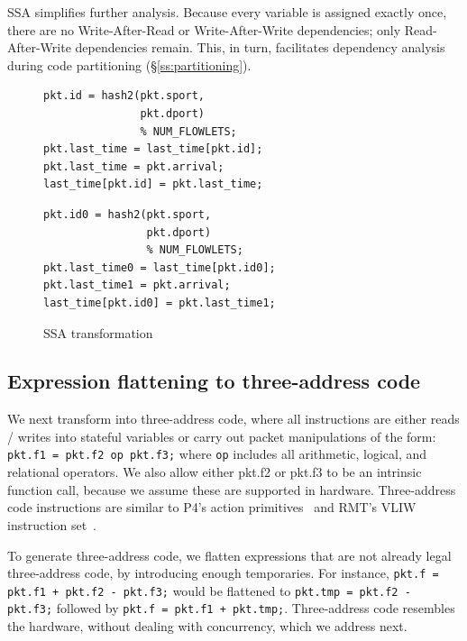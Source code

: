 SSA simplifies further analysis. Because every variable is assigned exactly
once, there are no Write-After-Read or Write-After-Write dependencies; only
Read-After-Write dependencies remain. This, in turn, facilitates dependency
analysis during code partitioning (\S\ref{ss:partitioning}).

\begin{figure}[!t]
  \begin{minipage}{0.48\textwidth}
  \begin{small}
  \begin{lstlisting}[style=customc]
pkt.id = hash2(pkt.sport,
               pkt.dport)
               % NUM_FLOWLETS;
pkt.last_time = last_time[pkt.id];
pkt.last_time = pkt.arrival;
last_time[pkt.id] = pkt.last_time;
  \end{lstlisting}
  \end{small}
  \end{minipage}
  \begin{minipage}{0.52\textwidth}
  \begin{small}
  \begin{lstlisting}[style=customc]
pkt.id0 = hash2(pkt.sport,
                pkt.dport)
                % NUM_FLOWLETS;
pkt.last_time0 = last_time[pkt.id0];
pkt.last_time1 = pkt.arrival;
last_time[pkt.id0] = pkt.last_time1;
  \end{lstlisting}
  \end{small}
  \end{minipage}
  \caption{SSA transformation}
\label{fig:ssa}
\end{figure}

\subsection{Expression flattening to three-address code}
We next transform into three-address code, where all instructions are either
reads / writes into stateful variables or carry out packet manipulations of the
form: \texttt{pkt.f1 = pkt.f2 op pkt.f3;} where \texttt{op} includes all
arithmetic, logical, and relational operators. We also allow either pkt.f2 or
pkt.f3 to be an intrinsic function call, because we assume these are supported
in hardware. Three-address code instructions are similar to P4's action
primitives~\cite{p4spec} and RMT's VLIW instruction set~\cite{rmt}.

To generate three-address code, we flatten expressions that are not already
legal three-address code, by introducing enough temporaries. For instance,
\texttt{pkt.f = pkt.f1 + pkt.f2 - pkt.f3;} would be flattened to
\texttt{pkt.tmp = pkt.f2 - pkt.f3;} followed by \texttt{pkt.f = pkt.f1 +
pkt.tmp;}. Three-address code resembles the hardware, without dealing with
concurrency, which we address next.

